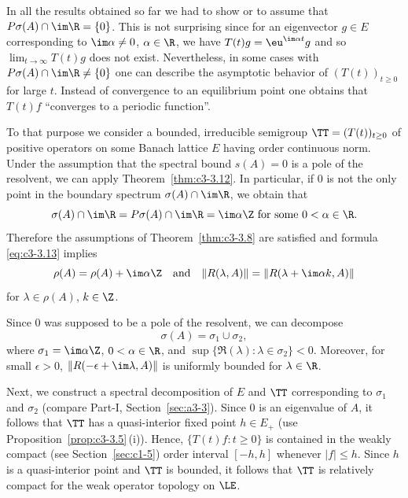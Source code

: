 In all the results obtained so far we had to show or to assume that $P{\sigma}(A) \cap \im\R = \{0\}$.
This is not surprising since for an eigenvector $g \in E$ corresponding to $\im\alpha \neq 0$, $\alpha \in \R$, we have $T(t)g = \eu^{\im\alpha t}g$ and so $\lim_{t\to\infty} T(t)g$ does not exist.
Nevertheless, in some cases with $P{\sigma}(A)\cap \im\R \neq \{0\}$ one can describe the asymptotic behavior of\/ $(T(t))_{t \geq 0}$ for large $t$.
Instead of convergence to an equilibrium point one obtains that $T(t)f$  \enquote{converges to a periodic function}.

To that purpose we consider a bounded, irreducible semigroup $\TT = (T(t))_{t \geq 0}$ of positive operators on some Banach lattice $E$ having order continuous norm.
Under the assumption that the spectral bound $s(A) = 0$ is a pole of the resolvent, we can apply Theorem~\ref{thm:c3-3.12}.
In particular, if\/ $0$ is not the only point in the boundary spectrum $\sigma(A)\cap \im\R$, we obtain that
\begin{equation*}\label{eq:c4-2.9-kgk}
\sigma(A)\cap \im\R = P{\sigma}(A)\cap \im\R = \im\alpha\Z \text{ for some } 0 < \alpha \in \R.
\end{equation*}
Therefore the assumptions of Theorem~\ref{thm:c3-3.8} are satisfied and formula \eqref{eq:c3-3.13} implies
\begin{equation}\label{eq:c4-2.10}
\rho(A) = \rho(A) + \im\alpha\Z \quad \text{and} \quad \|R(\lambda,A)\| = \|R(\lambda+\im\alpha k,A)\|
\end{equation}
for $\lambda \in \rho(A)$, $k \in \Z$.

Since $0$ was supposed to be a pole of the resolvent, we can decompose
\begin{equation*}\label{eq:c4-2.10-kgk}
\sigma(A) = \sigma_{1} \cup \sigma_{2},
\end{equation*}
where $\sigma_{1} = \im\alpha\Z$, $0 < \alpha \in \R$, and $\sup\{\Re(\lambda) \colon \lambda \in \sigma_{2}\} < 0$.
Moreover, for small $\epsilon > 0$, $\|R(-\epsilon+\im\lambda,A)\|$ is uniformly bounded for $\lambda \in \R$.

Next, we construct a spectral decomposition of\/ $E$ and $\TT$ corresponding to $\sigma_{1}$ and $\sigma_{2}$ (compare Part-I, Section~\ref{sec:a3-3}).
Since $0$ is an eigenvalue of\/ $A$, it follows that $\TT$ has a quasi-interior fixed point $h \in E_{+}$ (use Proposition~\ref{prop:c3-3.5}\,(i)).
Hence, $\{T(t)f \colon t \geq 0\}$ is contained in the weakly compact (see Section~\ref{sec:c1-5}) order interval $[-h,h]$ whenever $|f| \leq h$.
Since $h$ is a quasi-interior point and $\TT$ is bounded, it follows that $\TT$ is relatively compact for the weak operator topology on $\LE$.

